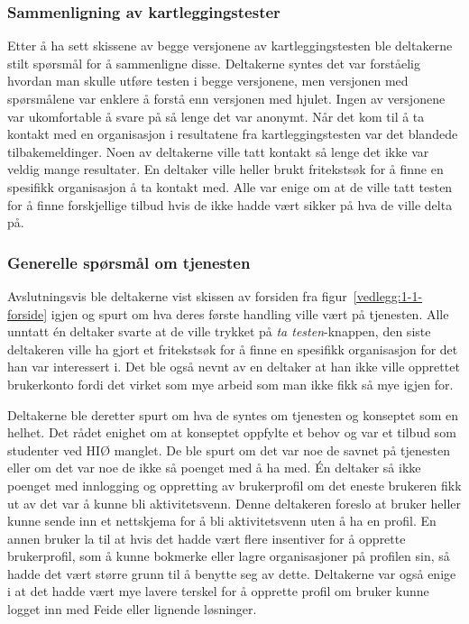 \subsubsection{Sammenligning av kartleggingstester}

Etter å ha sett skissene av begge versjonene av kartleggingstesten ble deltakerne stilt spørsmål for å sammenligne disse. Deltakerne syntes det var forståelig hvordan man skulle utføre testen i begge versjonene, men versjonen med spørsmålene var enklere å forstå enn versjonen med hjulet. Ingen av versjonene var ukomfortable å svare på så lenge det var anonymt. Når det kom til å ta kontakt med en organisasjon i resultatene fra kartleggingstesten var det blandede tilbakemeldinger. Noen av deltakerne ville tatt kontakt så lenge det ikke var veldig mange resultater. En deltaker ville heller brukt fritekstsøk for å finne en spesifikk organisasjon å ta kontakt med. Alle var enige om at de ville tatt testen for å finne forskjellige tilbud hvis de ikke hadde vært sikker på hva de ville delta på.

\subsubsection{Generelle spørsmål om tjenesten}

Avslutningsvis ble deltakerne vist skissen av forsiden fra figur~\ref{vedlegg:1-1-forside} igjen og spurt om hva deres første handling ville vært på tjenesten. Alle unntatt én deltaker svarte at de ville trykket på {\em  ta testen}-knappen, den siste deltakeren ville ha gjort et fritekstsøk for å finne en spesifikk organisasjon for det han var interessert i. Det ble også nevnt av en deltaker at han ikke ville opprettet brukerkonto fordi det virket som mye arbeid som man ikke fikk så mye igjen for.

Deltakerne ble deretter spurt om hva de syntes om tjenesten og konseptet som en helhet. Det rådet enighet om at konseptet oppfylte et behov og var et tilbud som studenter ved HIØ manglet. De ble spurt om det var noe de savnet på tjenesten eller om det var noe de ikke så poenget med å ha med. Én deltaker så ikke poenget med innlogging og oppretting av brukerprofil om det eneste brukeren fikk ut av det var å kunne bli aktivitetsvenn. Denne deltakeren foreslo at bruker heller kunne sende inn et nettskjema for å bli aktivitetsvenn uten å ha en profil. En annen bruker la til at hvis det hadde vært flere insentiver for å opprette brukerprofil, som å kunne bokmerke eller lagre organisasjoner på profilen sin, så hadde det vært større grunn til å benytte seg av dette. Deltakerne var også enige i at det hadde vært mye lavere terskel for å opprette profil om bruker kunne logget inn med Feide eller lignende løsninger.

